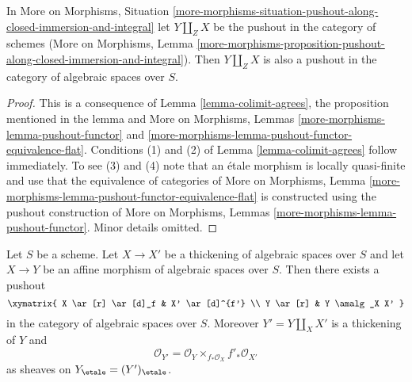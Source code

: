 \begin{lemma}
\label{lemma-pushout-along-closed-immersion-and-integral}
In More on Morphisms, Situation
\ref{more-morphisms-situation-pushout-along-closed-immersion-and-integral}
let $Y \amalg_Z X$ be the pushout in the category of schemes
(More on Morphisms, Lemma
\ref{more-morphisms-proposition-pushout-along-closed-immersion-and-integral}).
Then $Y \amalg_Z X$
is also a pushout in the category of algebraic spaces over $S$.
\end{lemma}

\begin{proof}
This is a consequence of Lemma \ref{lemma-colimit-agrees}, the proposition
mentioned in the lemma and More on Morphisms, Lemmas
\ref{more-morphisms-lemma-pushout-functor} and
\ref{more-morphisms-lemma-pushout-functor-equivalence-flat}.
Conditions (1) and (2) of Lemma \ref{lemma-colimit-agrees}
follow immediately. To see (3) and (4) note that an \'etale morphism
is locally quasi-finite and use that the equivalence of categories of
More on Morphisms, Lemma
\ref{more-morphisms-lemma-pushout-functor-equivalence-flat}
is constructed using the pushout construction of
More on Morphisms, Lemmas \ref{more-morphisms-lemma-pushout-functor}.
Minor details omitted.
\end{proof}

\begin{lemma}
\label{lemma-pushout-along-thickening}
Let $S$ be a scheme. Let $X \to X'$ be a thickening of algebraic spaces
over $S$ and let $X \to Y$ be an affine morphism of algebraic spaces over $S$.
Then there exists a pushout
$$
\xymatrix{
X \ar[r] \ar[d]_f
&
X' \ar[d]^{f'}
\\
Y \ar[r]
&
Y \amalg_X X'
}
$$
in the category of algebraic spaces over $S$. Moreover $Y' = Y \amalg_X X'$
is a thickening of $Y$ and
$$
\mathcal{O}_{Y'} = \mathcal{O}_Y \times_{f_*\mathcal{O}_X} f'_*\mathcal{O}_{X'}
$$
as sheaves on $Y_\etale = (Y')_\etale$.
\end{lemma}

